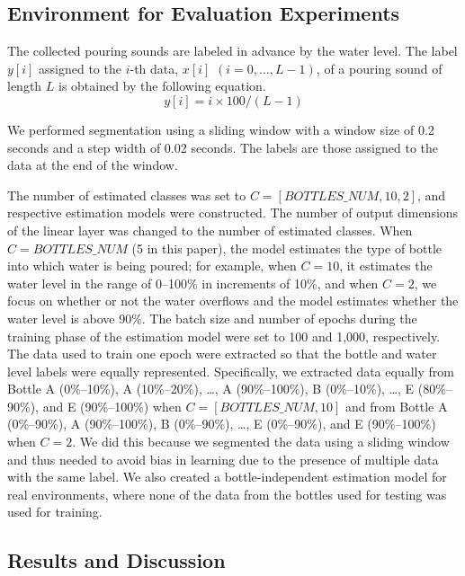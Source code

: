 \documentclass[sigconf,authordraft]{acmart}
\begin{document}
\subsection{Environment for Evaluation Experiments}
The collected pouring sounds are labeled in advance by the water level. The label $y[i]$ assigned to the $i$-th data, $x[i]$ $(i=0,\dots, L-1)$, of a pouring sound of length $L$ is obtained by the following equation.
\begin{equation}
  y[i]=i \times 100/(L-1)
\end{equation}

We performed segmentation using a sliding window with a window size of 0.2 seconds and a step width of 0.02 seconds. The labels are those assigned to the data at the end of the window.\par

The number of estimated classes was set to $C=[BOTTLES\_NUM,10,2]$, and respective estimation models were constructed. The number of output dimensions of the linear layer was changed to the number of estimated classes. When $C=BOTTLES\_NUM$ (5 in this paper), the model estimates the type of bottle into which water is being poured; for example, when $C=10$, it estimates the water level in the range of 0--100\% in increments of 10\%, and when $C=2$, we focus on whether or not the water overflows and the model estimates whether the water level is above 90\%. The batch size and number of epochs during the training phase of the estimation model were set to 100 and 1,000, respectively. The data used to train one epoch were extracted so that the bottle and water level labels were equally represented. Specifically, we extracted data equally from Bottle A (0\%--10\%), A (10\%--20\%), \dots, A (90\%--100\%), B (0\%--10\%), \dots, E (80\%--90\%), and E (90\%--100\%) when $C=[BOTTLES\_NUM,10]$ and from Bottle A (0\%--90\%), A (90\%--100\%), B (0\%--90\%), \dots, E (0\%--90\%), and E (90\%--100\%) when $C=2$. We did this because we segmented the data using a sliding window and thus needed to avoid bias in learning due to the presence of multiple data with the same label. We also created a bottle-independent estimation model for real environments, where none of the data from the bottles used for testing was used for training.


\subsection{Results and Discussion}
\end{document}
